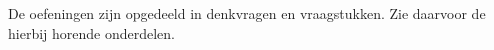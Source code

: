 \documentclass{ximera}
\begin{document}
	\author{Bart Lambregs}
    \xmsource\xmuitleg

De oefeningen zijn opgedeeld in denkvragen en vraagstukken. Zie daarvoor de hierbij horende onderdelen.
\end{document}
